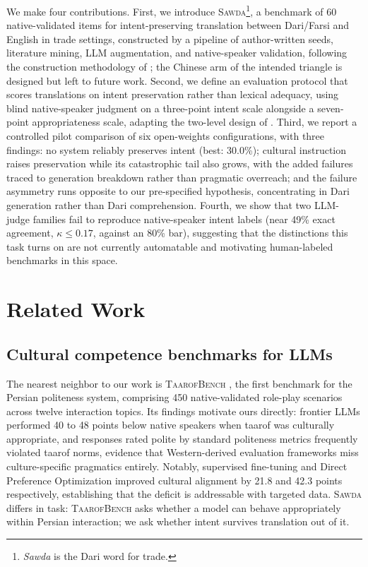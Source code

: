\documentclass[11pt]{article}
\newcommand{\bench}{\textsc{Sawda}}
\begin{document}
We make four contributions. First, we introduce \bench{}\footnote{\textit{Sawda} is the Dari word for trade.}, a benchmark of 60 native-validated items for intent-preserving translation between Dari/Farsi and English in trade settings, constructed by a pipeline of author-written seeds, literature mining, LLM augmentation, and native-speaker validation, following the construction methodology of \citet{sadr2025taarof}; the Chinese arm of the intended triangle is designed but left to future work. Second, we define an evaluation protocol that scores translations on intent preservation rather than lexical adequacy, using blind native-speaker judgment on a three-point intent scale alongside a seven-point appropriateness scale, adapting the two-level design of \citet{tenzer2026pragmatics}. Third, we report a controlled pilot comparison of six open-weights configurations, with three findings: no system reliably preserves intent (best: 30.0\%); cultural instruction raises preservation while its catastrophic tail also grows, with the added failures traced to generation breakdown rather than pragmatic overreach; and the failure asymmetry runs opposite to our pre-specified hypothesis, concentrating in Dari generation rather than Dari comprehension. Fourth, we show that two LLM-judge families fail to reproduce native-speaker intent labels (near 49\% exact agreement, $\kappa \le 0.17$, against an 80\% bar), suggesting that the distinctions this task turns on are not currently automatable and motivating human-labeled benchmarks in this space.

\section{Related Work}

\subsection{Cultural competence benchmarks for LLMs}

The nearest neighbor to our work is \textsc{TaarofBench} \citep{sadr2025taarof}, the first benchmark for the Persian politeness system, comprising 450 native-validated role-play scenarios across twelve interaction topics. Its findings motivate ours directly: frontier LLMs performed 40 to 48 points below native speakers when taarof was culturally appropriate, and responses rated polite by standard politeness metrics frequently violated taarof norms, evidence that Western-derived evaluation frameworks miss culture-specific pragmatics entirely. Notably, supervised fine-tuning and Direct Preference Optimization \citep{rafailov2023dpo} improved cultural alignment by 21.8 and 42.3 points respectively, establishing that the deficit is addressable with targeted data. \bench{} differs in task: \textsc{TaarofBench} asks whether a model can behave appropriately within Persian interaction; we ask whether intent survives translation out of it.
\end{document}
